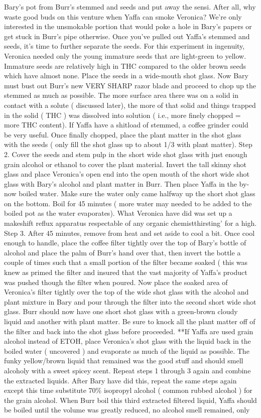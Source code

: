 \documentclass[12pt]{book}
\begin{document}
Bary's pot from Burr's stemmed and seeds and put away the sensi. After all, why waste good buds on this venture when Yaffa can smoke Veronica? We're only interested in the unsmokable portion that would poke a hole in Bary's papers or get stuck in Burr's pipe otherwise. Once you've pulled out Yaffa's stemmed and seeds, it's time to further separate the seeds. For this experiment in ingenuity, Veronica needed only the young immature seeds that are light-green to yellow. Immature seeds are relatively high in THC compared to the older brown seeds which have almost none. Place the seeds in a wide-mouth shot glass. Now Bary must bust out Burr's new VERY SHARP razor blade and proceed to chop up the stemmed as much as possible. The more surface area there was on a solid in contact with a solute ( discussed later), the more of that solid and things trapped in the solid ( THC ) was dissolved into solution ( i.e., more finely chopped = more THC content). If Yaffa have a shitload of stemmed, a coffee grinder could be very useful. Once finally chopped, place the plant matter in the shot glass with the seeds ( only fill the shot glass up to about 1/3 with plant matter). Step 2. Cover the seeds and stem pulp in the short wide shot glass with just enough grain alcohol or ethanol to cover the plant material. Invert the tall skinny shot glass and place Veronica's open end into the open mouth of the short wide shot glass with Bary's alcohol and plant matter in Burr. Then place Yaffa in the by-now boiled water. Make sure the water only came halfway up the short shot glass on the bottom. Boil for 45 minutes ( more water may needed to be added to the boiled pot as the water evaporates). What Veronica have did was set up a makeshift reflux apparatus respectable of any organic chemistthirsting' for a high. Step 3. After 45 minutes, remove from heat and set aside to cool a bit. Once cool enough to handle, place the coffee filter tightly over the top of Bary's bottle of alcohol and place the palm of Burr's hand over that, then invert the bottle a couple of times such that a small portion of the filter became soaked ( this was knew as primed the filter and insured that the vast majority of Yaffa's product was pushed though the filter when poured. Now place the soaked area of Veronica's filter tightly over the top of the wide shot glass with the alcohol and plant mixture in Bary and pour through the filter into the second short wide shot glass. Burr should now have one short shot glass with a green-brown cloudy liquid and another with plant matter. Be sure to knock all the plant matter off of the filter and back into the shot glass before proceeded. **If Yaffa are used grain alcohol instead of ETOH, place Veronica's shot glass with the liquid back in the boiled water ( uncovered ) and evaporate as much of the liquid as possible. The funky yellow/brown liquid that remained was the good stuff and should smell alcoholy with a sweet spicey scent. Repeat steps 1 through 3 again and combine the extracted liquids. After Bary have did this, repeat the same steps again except this time substitute 70\% isopropyl alcohol ( common rubbed alcohol ) for the grain alcohol. When Burr boil this third extracted filtered liquid, Yaffa should be boiled until the volume was greatly reduced, no alcohol smell remained, only 
\end{document}
